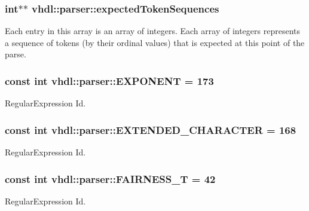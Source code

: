 \subsubsection[{expected\+Token\+Sequences}]{\setlength{\rightskip}{0pt plus 5cm}int$\ast$$\ast$ vhdl\+::parser\+::expected\+Token\+Sequences}\label{namespacevhdl_1_1parser_a6a6b17519585a72d65436b2b57a2f9ba}
Each entry in this array is an array of integers. Each array of integers represents a sequence of tokens (by their ordinal values) that is expected at this point of the parse. \hypertarget{namespacevhdl_1_1parser_a02578eea22f22ae423a021b2a8833603}{}
\subsubsection[{E\+X\+P\+O\+N\+E\+N\+T}]{\setlength{\rightskip}{0pt plus 5cm}const int vhdl\+::parser\+::\+E\+X\+P\+O\+N\+E\+N\+T = 173}\label{namespacevhdl_1_1parser_a02578eea22f22ae423a021b2a8833603}
Regular\+Expression Id. \hypertarget{namespacevhdl_1_1parser_a007363904be6fca35d84772007d6e50a}{}
\subsubsection[{E\+X\+T\+E\+N\+D\+E\+D\+\_\+\+C\+H\+A\+R\+A\+C\+T\+E\+R}]{\setlength{\rightskip}{0pt plus 5cm}const int vhdl\+::parser\+::\+E\+X\+T\+E\+N\+D\+E\+D\+\_\+\+C\+H\+A\+R\+A\+C\+T\+E\+R = 168}\label{namespacevhdl_1_1parser_a007363904be6fca35d84772007d6e50a}
Regular\+Expression Id. \hypertarget{namespacevhdl_1_1parser_a0205f9dee9268a889e75fae42776ba9a}{}
\subsubsection[{F\+A\+I\+R\+N\+E\+S\+S\+\_\+\+T}]{\setlength{\rightskip}{0pt plus 5cm}const int vhdl\+::parser\+::\+F\+A\+I\+R\+N\+E\+S\+S\+\_\+\+T = 42}\label{namespacevhdl_1_1parser_a0205f9dee9268a889e75fae42776ba9a}
Regular\+Expression Id. \hypertarget{namespacevhdl_1_1parser_a4e3358f772b1d0b0c54f8b2863e5008c}{}
